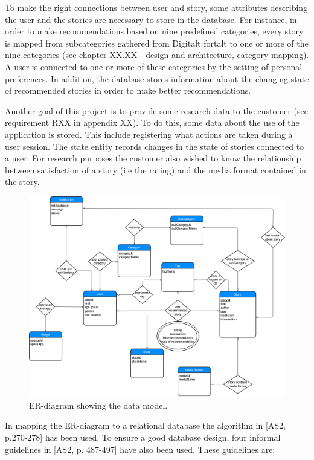 To make the right connections between user and story, some attributes describing the user and the stories are necessary to store in the database. For instance, in order to make recommendations based on nine predefined categories, every story is mapped from subcategories gathered from Digitalt fortalt to one or more of the nine categories (see chapter XX.XX - design and architecture, category mapping). A user is connected to one or more of these categories by the setting of personal preferences. In addition, the database stores information about the changing state of recommended stories in order to make better recommendations. \newline

Another goal of this project is to provide some research data to the customer (see requirement RXX in appendix XX). To do this, some data about the use of the application is stored. This include registering what actions are taken during a user session. The state entity records changes in the state of stories connected to a user. For research purposes the customer also wished to know the relationship between satisfaction of a story (i.e the rating) and the media format contained in the story.

\begin{figure}[h!]
	\centering
	\includegraphics[width=\textwidth]{fig/er_diagram}
	\caption{ER-diagram showing the data model.}
	\label{er_diagram}
\end{figure}

In mapping the ER-diagram to a relational database the algorithm in [AS2, p.270-278] has been used. To ensure a good database design, four informal guidelines in [AS2, p. 487-497] have also been used. These guidelines are:

